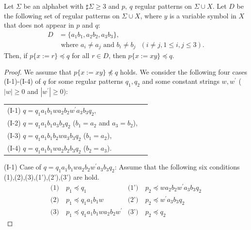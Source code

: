 \begin{lem}\label{lem:3consts_i}
  Let $\Sigma$ be an alphabet with $\sharp\Sigma \ge 3$ and $p,~q$ regular patterns on $\Sigma\cup X$.
  Let $D$ be the following set of regular patterns on $\Sigma\cup X$, where $y$ is a variable symbol in $X$ that does not appear in $p$ and $q$:
  \begin{align*}
  D & = \{ a_{1}b_{1}, a_{2}b_{2}, a_{3}b_{3}\},\\
  & \mbox{ where } a_{i} \ne a_{j} \mbox{ and } b_{i} \ne b_{j} \mbox{ } (i\ne j, 1\le i,j\le 3).
  \end{align*}
  Then, if $p \{ x := r \} \preceq q$ for all $r \in D$, then $p \{ x := xy \} \preceq q$.
\end{lem}

\begin{proof}
We assume that $p \{ x := xy \} \not\preceq q$ holds. 
We consider the following four cases (I-1)-(I-4) of $q$ for some regular patterns $q_{1},q_{2}$ and some constant strings $w,w^{\prime}$ ($|w|\geq 0$ and $|w^{\prime}|\geq 0$):

\smallskip
\noindent
\begin{tabular}{ll}
(I-1) $q=q_{1}a_{1}b_{1}wa_{2}b_{2}w^{\prime}a_{3}b_{3}q_{2}$,\\
(I-2) $q=q_{1}a_{1}b_{1}a_{3}b_{3}q_{2}$ ($b_{1}=a_{2}$ and $a_{3}=b_{2}$),\\
(I-3) $q=q_{1}a_{1}b_{1}b_{2}wa_{3}b_{3}q_{2}$ ($b_{1}=a_{2}$),\\
(I-4) $q=q_{1}a_{1}b_{1}wa_{2}b_{2}b_{3}q_{2}$ ($b_{2}=a_{3}$).
\end{tabular}
\smallskip

\noindent
(I-1) Case of $q=q_{1}a_{1}b_{1}wa_{2}b_{2}w^{\prime}a_{3}b_{3}q_{2}$:
Assume that the following six conditions (1),(2),(3),(1'),(2'),(3') are hold.
\begin{align*}
\textrm{(1)}~& p_{1} \preceq q_{1} & \textrm{(1')}~& p_{2} \preceq wa_{2}b_{2}w^{\prime}a_{3}b_{3}q_{2} \\
\textrm{(2)}~& p_{1} \preceq q_{1}a_{1}b_{1}w & \textrm{(2')}~& p_{2} \preceq w^{\prime}a_{3}b_{3}q_{2} \\
\textrm{(3)}~& p_{1} \preceq q_{1}a_{1}b_{1}wa_{2}b_{2}w^{\prime} & \textrm{(3')}~& p_{2} \preceq q_{2}
\end{align*}


\end{proof}
